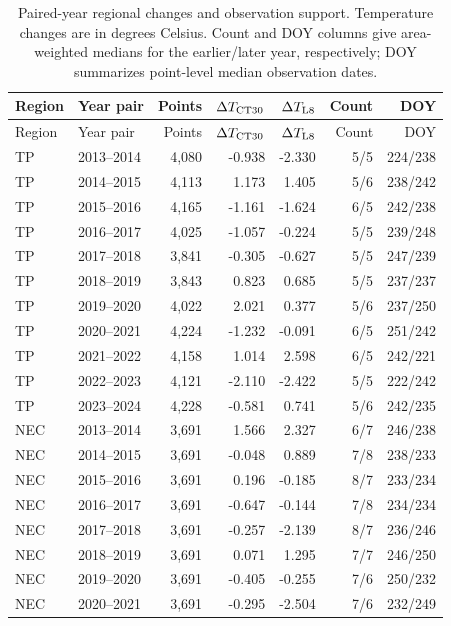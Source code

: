 \begin{longtable}{@{}llrrrrr@{}}
\caption{Paired-year regional changes and observation support. Temperature changes are in degrees Celsius. Count and DOY columns give area-weighted medians for the earlier/later year, respectively; DOY summarizes point-level median observation dates.}\label{tab:s6-interannual-pairs}\\
\toprule
Region & Year pair & Points & $\Delta T_{\rm CT30}$ & $\Delta T_{\rm L8}$ & Count & DOY \\
\midrule
\endfirsthead
\toprule
Region & Year pair & Points & $\Delta T_{\rm CT30}$ & $\Delta T_{\rm L8}$ & Count & DOY \\
\midrule
\endhead
\bottomrule
\endfoot
TP & 2013--2014 & 4,080 & -0.938 & -2.330 & 5/5 & 224/238 \\
TP & 2014--2015 & 4,113 & 1.173 & 1.405 & 5/6 & 238/242 \\
TP & 2015--2016 & 4,165 & -1.161 & -1.624 & 6/5 & 242/238 \\
TP & 2016--2017 & 4,025 & -1.057 & -0.224 & 5/5 & 239/248 \\
TP & 2017--2018 & 3,841 & -0.305 & -0.627 & 5/5 & 247/239 \\
TP & 2018--2019 & 3,843 & 0.823 & 0.685 & 5/5 & 237/237 \\
TP & 2019--2020 & 4,022 & 2.021 & 0.377 & 5/6 & 237/250 \\
TP & 2020--2021 & 4,224 & -1.232 & -0.091 & 6/5 & 251/242 \\
TP & 2021--2022 & 4,158 & 1.014 & 2.598 & 6/5 & 242/221 \\
TP & 2022--2023 & 4,121 & -2.110 & -2.422 & 5/5 & 222/242 \\
TP & 2023--2024 & 4,228 & -0.581 & 0.741 & 5/6 & 242/235 \\
NEC & 2013--2014 & 3,691 & 1.566 & 2.327 & 6/7 & 246/238 \\
NEC & 2014--2015 & 3,691 & -0.048 & 0.889 & 7/8 & 238/233 \\
NEC & 2015--2016 & 3,691 & 0.196 & -0.185 & 8/7 & 233/234 \\
NEC & 2016--2017 & 3,691 & -0.647 & -0.144 & 7/8 & 234/234 \\
NEC & 2017--2018 & 3,691 & -0.257 & -2.139 & 8/7 & 236/246 \\
NEC & 2018--2019 & 3,691 & 0.071 & 1.295 & 7/7 & 246/250 \\
NEC & 2019--2020 & 3,691 & -0.405 & -0.255 & 7/6 & 250/232 \\
NEC & 2020--2021 & 3,691 & -0.295 & -2.504 & 7/6 & 232/249 \\

\end{longtable}
